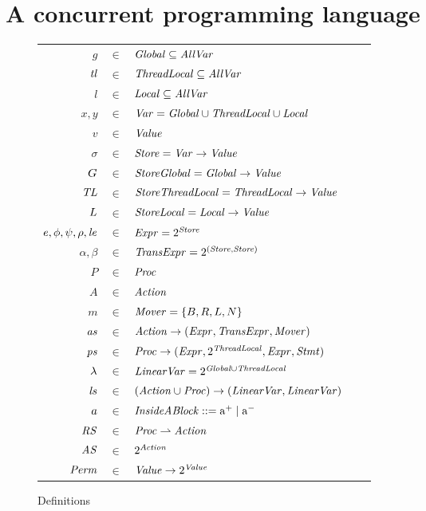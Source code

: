 \section{A concurrent programming language}
\label{sec:language}

\begin{figure}
\setlength{\tabcolsep}{3pt}
\begin{tabular}{rclcl}
$g$ & $\in$ & $\mathit{Global} \subseteq \mathit{AllVar}$ \\
$\mathit{tl}$ & $\in$ & $\mathit{ThreadLocal} \subseteq \mathit{AllVar}$ \\
$l$ & $\in$ & $\mathit{Local} \subseteq \mathit{AllVar}$ \\
$x,y$ & $\in$ & $\mathit{Var} = \mathit{Global} \cup \mathit{ThreadLocal} \cup \mathit{Local}$ \\
$v$ &  $\in$ & $\mathit{Value}$ \\
$\sigma$ & $\in$ & $\mathit{Store} = \mathit{Var} \rightarrow \mathit{Value}$ \\
$G$ & $\in$ & $\mathit{StoreGlobal} = \mathit{Global} \rightarrow \mathit{Value}$ \\
$\mathit{TL}$ & $\in$ & $\mathit{StoreThreadLocal} = \mathit{ThreadLocal}  \rightarrow \mathit{Value}$ \\
$L$ & $\in$ & $\mathit{StoreLocal} = \mathit{Local} \rightarrow \mathit{Value}$ \\
$e, \phi, \psi, \rho, \mathit{le}$ & $\in$ & $\mathit{Expr} = 2^{\mathit{Store}}$ \\
$\alpha, \beta$ & $\in$ & $\mathit{TransExpr} = 2^{(\mathit{Store},\mathit{Store})}$ \\
$P$ & $\in$ & $\mathit{Proc}$ \\
$A$ & $\in$ & $\mathit{Action}$ \\
$m$ & $\in$ & $\mathit{Mover} = \{B,R,L,N\}$\\
$\mathit{as}$ & $\in$ & $\mathit{Action} \rightarrow (\mathit{Expr}, \mathit{TransExpr}, \mathit{Mover})$ \\
$\mathit{ps}$ & $\in$ & $\mathit{Proc} \rightarrow (\mathit{Expr}, 2^{\mathit{ThreadLocal}}, \mathit{Expr}, \mathit{Stmt})$ \\
$\lambda$ & $\in$ & $\mathit{LinearVar} = 2^{\mathit{Global} \cup \mathit{ThreadLocal}}$ \\
$\mathit{ls}$ & $\in$ & $(\mathit{Action} \cup \mathit{Proc}) \rightarrow (\mathit{LinearVar}, \mathit{LinearVar})$ \\
$a$ & $\in$ & $\mathit{InsideABlock} ::= \mathrm{a^+} \mid \mathrm{a^-}$ \\
$\mathit{RS}$ & $\in$ & $\mathit{Proc} \rightharpoonup \mathit{Action}$ \\
$\mathit{AS}$ & $\in$ & $2^{\mathit{Action}}$ \\
$\mathit{Perm}$ & $\in$ & $\mathit{Value} \rightarrow 2^{\mathit{Value}}$
\end{tabular}
\caption{Definitions}
\label{fig:definitions}
\end{figure}


